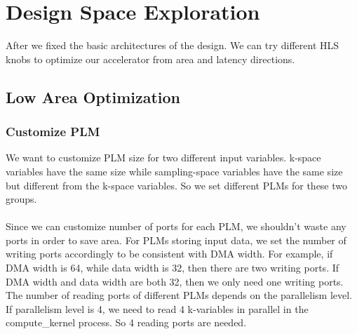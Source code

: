 \documentclass{sig-alternate}
\begin{document}
\section{Design Space Exploration}
After we fixed the basic architectures of the design. We can try different HLS knobs to optimize our accelerator from area and latency directions. \\
\subsection{Low Area Optimization}

\subsubsection{Customize PLM}
We want to customize PLM size for two different input variables. k-space variables have the same size while sampling-space variables have the same size but different from the k-space variables. So we set different PLMs for these two groups. \\
\\
Since we can customize number of ports for each PLM, we shouldn't waste any ports in order to save area. For PLMs storing input data, we set the number of writing ports accordingly to be consistent with DMA width. For example, if DMA width is 64, while data width is 32, then there are two writing ports. If DMA width and data width are both 32, then we only need one writing ports. The number of reading ports of different PLMs depends on the parallelism level. If parallelism level is 4, we need to read 4 k-variables in parallel in the compute\_kernel process. So 4 reading ports are needed.\\
\end{document}
